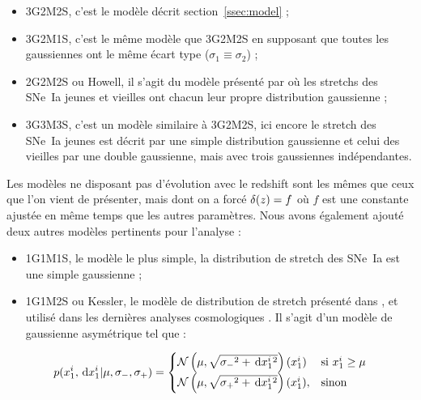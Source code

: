 \documentclass[a4paper, 12pt, svgnames]{article}
\begin{document}
\begin{itemize}

    \item 3G2M2S, c'est le modèle décrit section~\ref{ssec:model} ; 

    \item 3G2M1S, c'est le même modèle que 3G2M2S en supposant que toutes les
        gaussiennes ont le même écart type ($\sigma_1\equiv\sigma_2$) ;

    \item 2G2M2S ou Howell, il s'agit du modèle présenté par
        \cite{howell_effect_2009} où les stretchs des SNe~Ia jeunes et vieilles
        ont chacun leur propre distribution gaussienne ;

    \item 3G3M3S, c'est un modèle similaire à 3G2M2S, ici encore le stretch des
        SNe~Ia jeunes est décrit par une simple distribution gaussienne et celui
        des vieilles par une double gaussienne, mais avec trois gaussiennes
        indépendantes.

\end{itemize}

Les modèles ne disposant pas d'évolution avec le redshift sont les mêmes que
ceux que l'on vient de présenter, mais dont on a forcé $\delta(z)=f$ où $f$ est une
constante ajustée en même temps que les autres paramètres. Nous avons également
ajouté deux autres modèles pertinents pour l'analyse :

\begin{itemize}

    \item 1G1M1S, le modèle le plus simple, la distribution de stretch des
        SNe~Ia est une simple gaussienne ;

    \item 1G1M2S ou Kessler, le modèle de distribution de stretch présenté dans
        \cite{kessler_correcting_2017}, et utilisé dans les dernières analyses
        cosmologiques \cite{scolnic_complete_2018}. Il s'agit d'un modèle de
        gaussienne asymétrique tel que :

\end{itemize}

\begin{align}
 p(x_1^i, \,\mathrm{d} x_1^i | \mu, \sigma_-, \sigma_+) = 
    \begin{cases}
        \mathcal{N} \left(\mu, \sqrt{\sigma_-{}^2 + \,\mathrm{d} x_1^i{}^{2}}\right) (x_1^i) & \text{si
        } x_1^i\geq \mu\\
        \mathcal{N} \left(\mu, \sqrt{\sigma_+{}^2 + \,\mathrm{d} x_1^i{}^{2}}\right) (x_1^i), &
        \text{sinon}
    \end{cases}
\end{align} 
\end{document}
